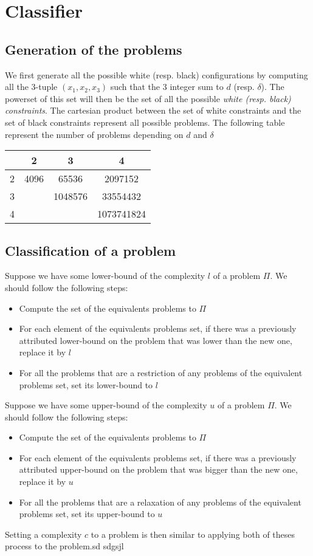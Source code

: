 \documentclass{article}
\theoremstyle{definition}
\newcommand{\wdd}[0]{d}
\newcommand{\bdd}[0]{\delta}
\begin{document}
\section{Classifier}
\subsection{Generation of the problems}
We first generate all the possible white (resp. black) configurations by computing all the 3-tuple $(x_1,x_2, x_3)$ such that the 3 integer sum to $\wdd$ (resp. $\bdd$).
The powerset of this set will then be the set of all the possible \textit{white (resp. black) constraints}.
The cartesian product between the set of white constraints and the set of black constraints represent all possible problems. The following table represent the number of problems depending on $\wdd$ and $\bdd$
\begin{center}
\begin{tabular}{ | c | c | c | c |}
 \hline
 \diagbox{$\wdd$}{$\bdd$} & 2 & 3 & 4 \\ 
 \hline
 2 & 4096 & 65536 & 2097152\\
 \hline
 3 &  & 1048576 & 33554432\\
 \hline
 4 &  &  &  1073741824\\
\hline
\end{tabular}
\end{center}
\subsection{Classification of a problem}
Suppose we have some lower-bound of the complexity $l$ of a problem $\Pi$. We should follow the following steps:
\begin{itemize}
    \item Compute the set of the equivalents problems to $\Pi$
    \item For each element of the equivalents problems set, if there was a previously attributed lower-bound on the problem that was lower than the new one, replace it by $l$
    \item For all the problems that are a restriction of any problems of the equivalent problems set, set its lower-bound to $l$
\end{itemize}
Suppose we have some upper-bound of the complexity $u$ of a problem $\Pi$. We should follow the following steps:
\begin{itemize}
    \item Compute the set of the equivalents problems to $\Pi$
    \item For each element of the equivalents problems set, if there was a previously attributed upper-bound on the problem that was bigger than the new one, replace it by $u$
    \item For all the problems that are a relaxation of any problems of the equivalent problems set, set its upper-bound to $u$
\end{itemize}
Setting a complexity $c$ to a problem is then similar to applying both of theses process to the problem.sd
sdgsjl
\end{document}
